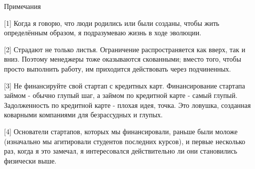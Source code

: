 \documentclass[ebook,12pt,oneside,openany]{memoir}
\begin{document}
Примечания

[1] Когда я говорю, что люди родились или были созданы, чтобы жить
определённым образом, я подразумеваю жизнь в ходе эволюции.

[2] Страдают не только листья. Ограничение распространяется как вверх,
так и вниз. Поэтому менеджеры тоже оказываются скованными; вместо
того, чтобы просто выполнить работу, им приходится действовать через
подчиненных.

[3] Не финансируйте свой стартап с кредитных карт. Финансирование
стартапа займом - обычно глупый шаг, а займом по кредитной карте -
самый глупый. Задолженность по кредитной карте - плохая идея, точка.
Это ловушка, созданная коварными компаниями для безрассудных и глупых.

[4] Основатели стартапов, которых мы финансировали, раньше были моложе
(изначально мы агитировали студентов последних курсов), и первые
несколько раз, когда я это замечал, я интересовался действительно ли
они становились физически выше.
\end{document}
